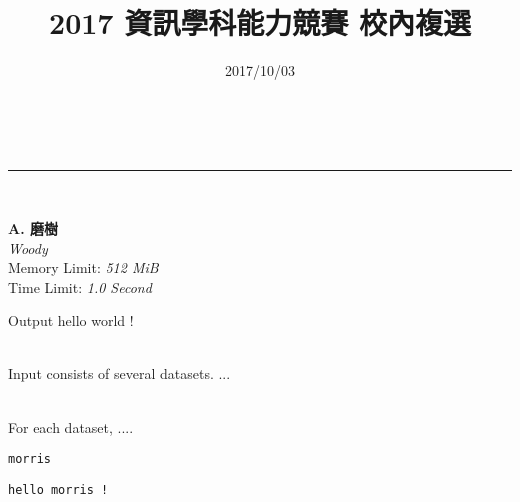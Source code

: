 \documentclass[a4paper,11pt]{article}
\makeatletter
\newcommand{\linia}{\rule{\linewidth}{0.5pt}}
\theoremstyle{mytheor}
\renewcommand{\maketitle}{
\begin{center}
\vspace{2ex}
{\huge \textsc{\@title}}
\vspace{1ex}
\\
\linia\\
\@author \hfill \@date
\vspace{4ex}
\end{center}
}
\newcommand\Problem[4][\DefaultOpt]{
  \def\DefaultOpt{#1}
  \begin{center}
    {\Large\bfseries #1}\\         %
    {\large\em #2}\\            %
    {\large Memory Limit: {\em #3 MiB}}\\     %
    {\large Time Limit: {\em #4 Second}}\\    %
  \end{center}
}
\makeatother
\begin{document}
\title{2017 資訊學科能力競賽 校內複選}
\author{}
\date{2017/10/03}
\maketitle


\Problem[A. 磨樹]{Woody}{512}{1.0}


Output hello world !



\vspace*{.3in} \\

Input consists of several datasets.  ...

\vspace*{.3in} \\

For each dataset, ....

\vspace*{.3in}  
\begin{verbatim}
morris
\end{verbatim}

\vspace*{.3in} 
\begin{verbatim}
hello morris !
\end{verbatim}
\end{document}
